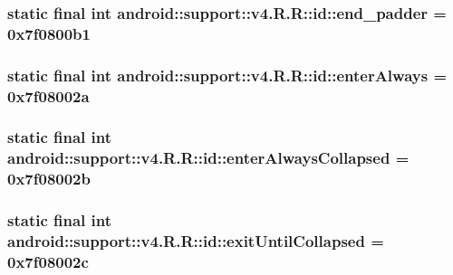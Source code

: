 \hypertarget{classandroid_1_1support_1_1v4_1_1_r_1_1id_27ba517bc3fad6ce586caac6ff598bf7}{
\subsubsection[{end\_\-padder}]{\setlength{\rightskip}{0pt plus 5cm}static final int android::support::v4.R.R::id::end\_\-padder = 0x7f0800b1}}
\label{classandroid_1_1support_1_1v4_1_1_r_1_1id_27ba517bc3fad6ce586caac6ff598bf7}


\hypertarget{classandroid_1_1support_1_1v4_1_1_r_1_1id_402641f8f4c737e1ddd88b368aaf5a6c}{
\subsubsection[{enterAlways}]{\setlength{\rightskip}{0pt plus 5cm}static final int android::support::v4.R.R::id::enterAlways = 0x7f08002a}}
\label{classandroid_1_1support_1_1v4_1_1_r_1_1id_402641f8f4c737e1ddd88b368aaf5a6c}


\hypertarget{classandroid_1_1support_1_1v4_1_1_r_1_1id_c5fd55853b6834b5c0df201e64b88941}{
\subsubsection[{enterAlwaysCollapsed}]{\setlength{\rightskip}{0pt plus 5cm}static final int android::support::v4.R.R::id::enterAlwaysCollapsed = 0x7f08002b}}
\label{classandroid_1_1support_1_1v4_1_1_r_1_1id_c5fd55853b6834b5c0df201e64b88941}


\hypertarget{classandroid_1_1support_1_1v4_1_1_r_1_1id_325d0b78cada253747ffb3ea6c58cf33}{
\subsubsection[{exitUntilCollapsed}]{\setlength{\rightskip}{0pt plus 5cm}static final int android::support::v4.R.R::id::exitUntilCollapsed = 0x7f08002c}}
\label{classandroid_1_1support_1_1v4_1_1_r_1_1id_325d0b78cada253747ffb3ea6c58cf33}


